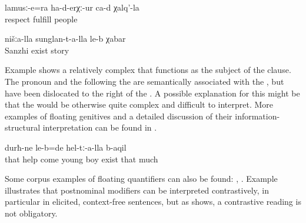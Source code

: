 \begin{exe}
	\ex	\label{ex:The people's respect also finished}
	\gll	lamusː-e=ra	ha-d-erχː-ur	ca-d	χalq'-la\\
		respect	fulfill		people\\
	\glt	{}

	\ex	\label{ex:‎We Sanzhi people have a story}
	\gll	nišːa-lla	sunglan-t-a-lla	le-b	χabar\\
			Sanzhi	exist	story\\
	\glt	{}
\end{exe}


Example  shows a relatively complex  that functions as the subject of the  clause. The  pronoun and the  following the  are semantically associated with the , but have been dislocated to the right of the . A possible explanation for this might be that the  would be otherwise quite complex and difficult to interpret. More examples of floating genitives and a detailed discussion of their information-structural interpretation can be found in . 

\begin{exe}
	\ex	\label{ex:‎They had many young boys who had come to help}
		durħ-ne	le-b=de hel-tː-a-lla	b-aqil\\
		that	help	come	young	boy	exist	that	much\\
	\glt	{}
\end{exe}

Some corpus examples of floating quantifiers can also be found: , . Example  illustrates that postnominal modifiers can be interpreted contrastively, in particular in elicited, context-free sentences, but as  shows, a contrastive reading is not obligatory. 

